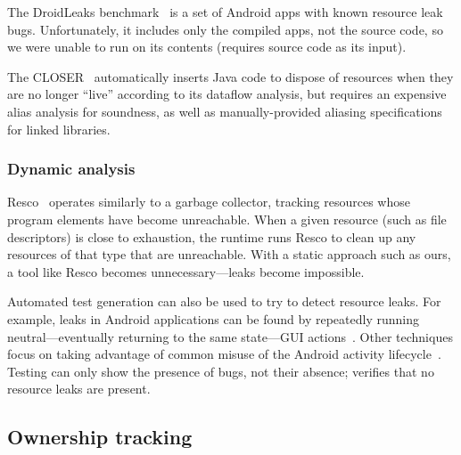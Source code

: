 The DroidLeaks benchmark~\cite{liu2019droidleaks} is a set of Android
apps with known resource leak bugs. Unfortunately, it includes only
the compiled apps, not the source code, so we were unable to run \Tool
on its contents (\Tool requires source code as its input).

The CLOSER~\cite{dillig2008closer} automatically inserts Java code to
dispose of resources when they are no longer ``live'' according to its
dataflow analysis, but requires an expensive alias analysis for
soundness, as well as manually-provided aliasing specifications for
linked libraries.


\subsubsection{Dynamic analysis}

Resco~\cite{dai2013resco} operates similarly to a garbage collector,
tracking resources whose program elements have become
unreachable. When a given resource (such as file descriptors) is close
to exhaustion, the runtime runs Resco to clean up any resources of
that type that are unreachable.  With a static approach such as ours,
a tool like Resco becomes unnecessary---leaks become impossible.

Automated test generation can also be used to try to detect resource
leaks. For example, leaks in Android applications can be found by
repeatedly running neutral---eventually returning to the same
state---GUI actions~\cite{wu2018sentinel,zhang2016automated}.
Other techniques focus on taking advantage of common misuse of
the Android activity lifecycle~\cite{amalfitano2020memories}.
Testing can only show the presence of bugs, not their absence;
\Tool verifies that no resource leaks are present.

\subsection{Ownership tracking}




